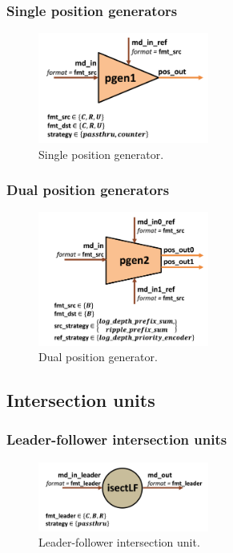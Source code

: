 \subsubsection{Single position generators}

\begin{figure}[H]
    \centering
    \includegraphics[width=0.5\textwidth]{figures/pgen1.png}
    \caption{Single position generator.}
    \label{fig:pgen1}
\end{figure}

\subsubsection{Dual position generators}

\begin{figure}[H]
    \centering
    \includegraphics[width=0.5\textwidth]{figures/pgen2.png}
    \caption{Dual position generator.}
    \label{fig:pgen2}
\end{figure}

\subsection{Intersection units}

\subsubsection{Leader-follower intersection units}

\begin{figure}[H]
    \centering
    \includegraphics[width=0.5\textwidth]{figures/isectlf.png}
    \caption{Leader-follower intersection unit.}
    \label{fig:fopt}
\end{figure}

